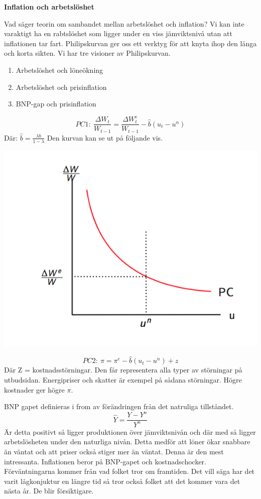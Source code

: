 \documentclass{article}
\begin{document}
\textbf{Inflation och arbetslöshet}
\vspace{5mm} \par \noindent 
Vad säger teorin om sambandet mellan arbetslöshet och inflation? Vi kan inte varaktigt ha en rabtslöshet som ligger under en viss jämviktsnivå utan att inflationen tar fart. Philipskurvan ger oss ett verktyg för att knyta ihop den långa och korta sikten. Vi har tre visioner av Philipskurvan. 
\begin{enumerate}
 \item Arbetslöshet och löneökning
 \item Arbetslöshet och prisinflation
 \item BNP-gap och prisinflation
\end{enumerate}

$$
   PC1:\ \frac{\Delta W_t}{W_{t-1}} = \frac{\Delta W^e_t}{W_{t-1}} - \hat{b}(u_t - u^n) 
$$
Där: $ \hat{b} = \frac{\lambda b}{1-\lambda}$
Den kurvan kan se ut på följande vis.

\includegraphics[scale=0.5]{skarm8}

$$
PC2: \ \pi = \pi^e - \hat{b}(u_t-u^n) + z
$$
Där Z = kostnadsstörningar. Den får representera alla typer av störningar på utbudsidan. Energipriser och skatter är exempel på sådana störningar. Högre kostnader ger högre $ \pi$.  \vspace{5mm} \par \noindent 

BNP gapet definieras i from av förändringen från det natruliga tillståndet. 
$$
\hat{Y} = \frac{Y-Y^n}{Y^n}
$$
Är detta positivt så ligger produktionen över jämviktsnivån och där med så ligger arbetslösheten under den naturliga nivån. Detta medför att löner ökar snabbare än väntat och att priser också stiger mer än väntat. Denna är den mest intressanta. Inflationen beror på BNP-gapet och kostnadschocker. Förväntningarna kommer från vad folket tror om framtiden. Det vill säga har det varit lågkonjuktur en längre tid så tror också folket att det kommer vara det nästa år. De blir försiktigare. 
\end{document}
